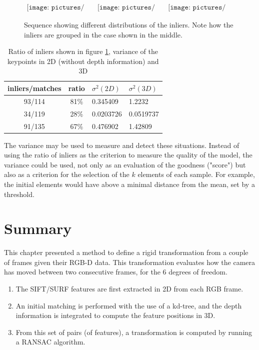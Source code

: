 \begin{figure}[H]
\centering$
 \begin{array}{ccc}
 \texttt{[image: pictures/bad\_transform1]} &
 \texttt{[image: pictures/bad\_transform2]} &
 \texttt{[image: pictures/bad\_transform3]}
 \end{array}$
\caption{Sequence showing different distributions of the inliers. Note how the inliers are grouped in the case shown in the middle.}
\label{fig:bad_transform}
\end{figure}

\begin{table}[h]
\begin{center}
\begin{tabular}{ccll}
 inliers/matches & ratio & $\sigma^2(2D)$ & $\sigma^2(3D)$\\
 \hline
 93/114 &	81\% &	0.345409 &	1.2232\\
 34/119 &	28\% &	0.0203726 &	0.0519737\\
 91/135 &	67\% &	0.476902 &	1.42809\\
\end{tabular}
\end{center}
\caption{Ratio of inliers shown in figure \ref{fig:bad_transform}, variance of the keypoints in 2D (without depth information) and 3D}
\end{table}

The variance may be used to measure and detect these situations. Instead of using the ratio of inliers as the criterion to measure the quality of the model, the variance could be used, not only as an evaluation of the goodness ("score") but also as a criterion for the selection of the $k$ elements of each sample. For example, the initial elements would have above a minimal distance from the mean, set by a threshold.

\section{Summary}

This chapter presented a method to define a rigid transformation from a couple of frames given their RGB-D data. This transformation evaluates how the camera has moved between two consecutive frames, for the 6 degrees of freedom.

\begin{enumerate}
\item The \gls{SIFT}/\gls{SURF} features are first extracted in 2D from each RGB frame.
\item An initial matching is performed with the use of a kd-tree, and the depth information is integrated to compute the feature positions in 3D.
\item From this set of pairs (of features), a transformation is computed by running a \gls{RANSAC} algorithm.
\end{enumerate}

